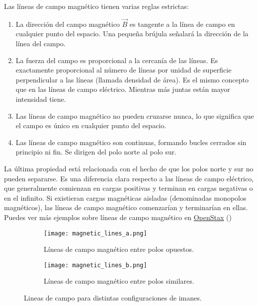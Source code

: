 Las líneas de campo magnético tienen varias reglas estrictas:
\begin{enumerate}
  \item La dirección del campo magnético \(\vec{B}\) es tangente a la línea de campo en cualquier punto del espacio. Una pequeña brújula señalará la dirección de la línea del campo.
  \item La fuerza del campo es proporcional a la cercanía de las líneas. Es exactamente proporcional al número de líneas por unidad de superficie perpendicular a las líneas (llamada densidad de área). Es el mismo concepto que en las líneas de campo eléctrico. Mientras más juntas están mayor intensidad tiene.
  \item Las líneas de campo magnético no pueden cruzarse nunca, lo que significa que el campo es único en cualquier punto del espacio.
  \item Las líneas de campo magnético son continuas, formando bucles cerrados sin principio ni fin. Se dirigen del polo norte al polo sur.
\end{enumerate}

La última propiedad está relacionada con el hecho de que los polos norte y sur no pueden separarse. Es una diferencia clara respecto a las líneas de campo eléctrico, que generalmente comienzan en cargas positivas y terminan en cargas negativas o en el infinito. Si existieran cargas magnéticas aisladas (denominadas monopolos magnéticos), las líneas de campo magnético comenzarían y terminarían en ellas. Puedes ver más ejemplos sobre líneas de campo magnético en \href{https://openstax.org/books/f%C3%ADsica-universitaria-volumen-2/pages/11-2-campos-y-lineas-magneticas}{OpenStax} (\cite{openstax})

\begin{figure}[ht]
  \centering
  \begin{subfigure}[b]{0.35\textwidth}
      \centering
      \texttt{[image: magnetic\_lines\_a.png]}
      \caption{Líneas de campo magnético entre polos opuestos.}
      \label{fig:polos_opuestos}
  \end{subfigure}
  \hspace{10pt}
  \begin{subfigure}[b]{0.35\textwidth}
      \centering
      \texttt{[image: magnetic\_lines\_b.png]}
      \caption{Líneas de campo magnético entre polos similares.}
      \label{fig:polos_iguales}
  \end{subfigure}
  \caption{Lineas de campo para distintas configuraciones de imanes.}
  \label{fig:lineas_de_campo_magnético_entre_imanes}
\end{figure}

